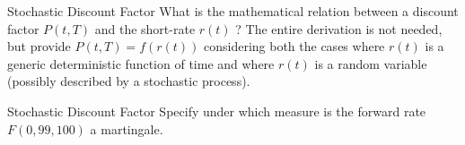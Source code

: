 \documentclass{beamer}
\begin{document}
\begin{frame}{}
	\begin{block}{Stochastic Discount Factor}
		What is the mathematical relation between a discount factor $P(t,T)$ and the short-rate $r(t)$ ? The entire derivation is not needed, but provide $P(t,T) = f(r(t))$ considering both the cases where $r(t)$ is a generic deterministic function of time and where $r(t)$ is a random variable (possibly described by a stochastic process).
	\end{block}
\end{frame}

\begin{frame}{}
	\begin{block}{Stochastic Discount Factor}
		Specify under which measure is the forward rate $F(0,99,100)$ a martingale.
	\end{block}
\end{frame}
\end{document}
